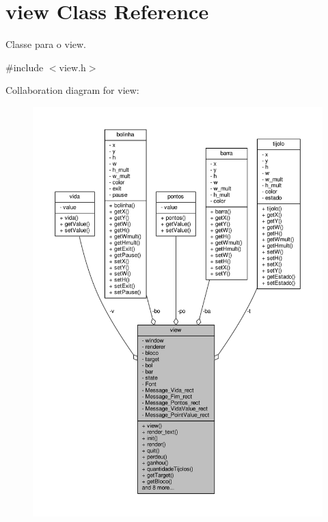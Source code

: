 \hypertarget{classview}{}\section{view Class Reference}
\label{classview}


Classe para o view.  




{\ttfamily \#include $<$view.\+h$>$}



Collaboration diagram for view\+:\nopagebreak
\begin{figure}[H]
\begin{center}
\leavevmode
\includegraphics[width=350pt]{classview__coll__graph}
\end{center}
\end{figure}

